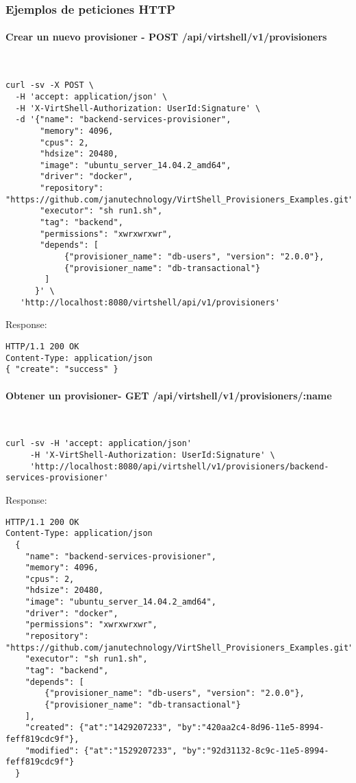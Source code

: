 \subsubsection{Ejemplos de peticiones HTTP}

\paragraph{Crear un nuevo provisioner - POST /api/virtshell/v1/provisioners} ~\\


\begin{lstlisting}[style=json]
curl -sv -X POST \
  -H 'accept: application/json' \
  -H 'X-VirtShell-Authorization: UserId:Signature' \
  -d '{"name": "backend-services-provisioner",
       "memory": 4096,
       "cpus": 2,
       "hdsize": 20480,
       "image": "ubuntu_server_14.04.2_amd64",
       "driver": "docker",
       "repository": "https://github.com/janutechnology/VirtShell_Provisioners_Examples.git",
       "executor": "sh run1.sh",
       "tag": "backend",
       "permissions": "xwrxwrxwr",
       "depends": [
            {"provisioner_name": "db-users", "version": "2.0.0"},
            {"provisioner_name": "db-transactional"}
        ]
      }' \
   'http://localhost:8080/virtshell/api/v1/provisioners'
\end{lstlisting}

Response:

\begin{lstlisting}[style=json]
HTTP/1.1 200 OK
Content-Type: application/json
{ "create": "success" }
\end{lstlisting}

\paragraph{Obtener un provisioner- GET /api/virtshell/v1/provisioners/:name} ~\\

\begin{lstlisting}[style=json]
curl -sv -H 'accept: application/json' 
     -H 'X-VirtShell-Authorization: UserId:Signature' \ 
     'http://localhost:8080/api/virtshell/v1/provisioners/backend-services-provisioner'
\end{lstlisting}

Response:

\begin{lstlisting}[style=json]
HTTP/1.1 200 OK
Content-Type: application/json
  {
    "name": "backend-services-provisioner",
    "memory": 4096,
    "cpus": 2,
    "hdsize": 20480,
    "image": "ubuntu_server_14.04.2_amd64",
    "driver": "docker",
    "permissions": "xwrxwrxwr",
    "repository": "https://github.com/janutechnology/VirtShell_Provisioners_Examples.git",
    "executor": "sh run1.sh",
    "tag": "backend",
    "depends": [
        {"provisioner_name": "db-users", "version": "2.0.0"},
        {"provisioner_name": "db-transactional"}
    ],
    "created": {"at":"1429207233", "by":"420aa2c4-8d96-11e5-8994-feff819cdc9f"},
    "modified": {"at":"1529207233", "by":"92d31132-8c9c-11e5-8994-feff819cdc9f"}    
  }
\end{lstlisting}

